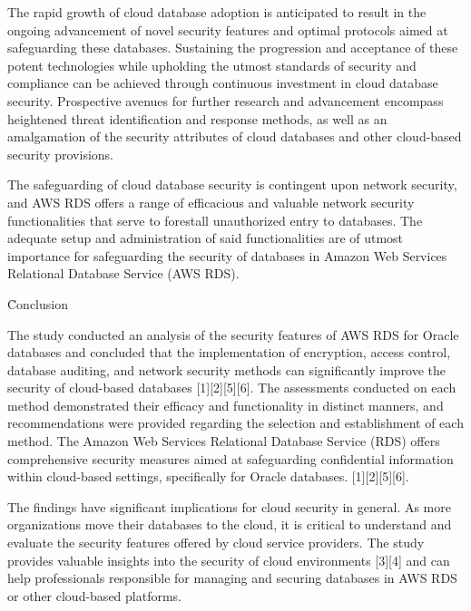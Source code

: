 \documentclass{ieee}
\begin{document}

The rapid growth of cloud database adoption is anticipated to result in the ongoing advancement of novel security features and optimal protocols aimed at safeguarding these databases. Sustaining the progression and acceptance of these potent technologies while upholding the utmost standards of security and compliance can be achieved through continuous investment in cloud database security. Prospective avenues for further research and advancement encompass heightened threat identification and response methods, as well as an amalgamation of the security attributes of cloud databases and other cloud-based security provisions.

The safeguarding of cloud database security is contingent upon network security, and AWS RDS offers a range of efficacious and valuable network security functionalities that serve to forestall unauthorized entry to databases. The adequate setup and administration of said functionalities are of utmost importance for safeguarding the security of databases in Amazon Web Services Relational Database Service (AWS RDS).

\h{Conclusion}

The study conducted an analysis of the security features of AWS RDS for Oracle databases and concluded that the implementation of encryption, access control, database auditing, and network security methods can significantly improve the security of cloud-based databases [1][2][5][6]. The assessments conducted on each method demonstrated their efficacy and functionality in distinct manners, and recommendations were provided regarding the selection and establishment of each method. The Amazon Web Services Relational Database Service (RDS) offers comprehensive security measures aimed at safeguarding confidential information within cloud-based settings, specifically for Oracle databases. [1][2][5][6].


The findings have significant implications for cloud security in general. As more organizations move their databases to the cloud, it is critical to understand and evaluate the security features offered by cloud service providers. The study provides valuable insights into the security of cloud environments [3][4] and can help professionals responsible for managing and securing databases in AWS RDS or other cloud-based platforms.
\end{document}
